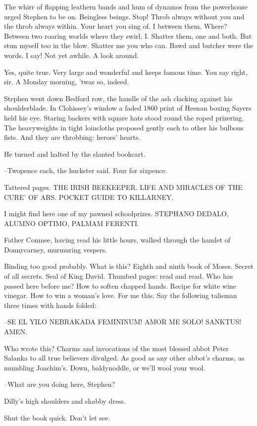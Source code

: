 The whirr of flapping leathern bands
and hum of dynamos from the
powerhouse
urged Stephen to be on.
Beingless beings.
Stop!
Throb always
without you and the throb always within.
Your heart you sing of.
I
between them.
Where?
Between two roaring worlds where they swirl, I.
Shatter them, one and both.
But stun myself too in the blow.
Shatter me
you who can.
Bawd and butcher were the words.
I say!
Not yet awhile.
A
look around.

Yes, quite true.
Very large and wonderful and keeps famous time.
You say
right, sir.
A Monday morning, 'twas so, indeed.

Stephen went down Bedford row,
the handle of the ash
clacking against his
shoulderblade.
In Clohissey's window
a faded 1860 print of Heenan boxing
Sayers
held his eye.
Staring backers with square hats
stood round the
roped prizering.
The heavyweights in tight loincloths proposed gently
each to other
his bulbous fists.
And they are throbbing:
heroes' hearts.

He turned and halted by the slanted bookcart.

--Twopence each,
the huckster said.
Four for sixpence.

Tattered pages.
THE IRISH BEEKEEPER.
LIFE AND MIRACLES OF THE CURE' OF
ARS.
POCKET GUIDE TO KILLARNEY.

I might find here one of my pawned schoolprizes.
STEPHANO DEDALO, ALUMNO OPTIMO, PALMAM FERENTI.

Father Conmee, having read his little hours,
walked through the hamlet of
Donnycarney,
murmuring vespers.

Binding too good probably.
What is this?
Eighth and ninth book of Moses.
Secret of all secrets.
Seal of King David.
Thumbed pages: read and read.
Who has passed here before me?
How to soften chapped hands.
Recipe for
white wine vinegar.
How to win a woman's love.
For me this.
Say the
following talisman three times with hands folded:

--SE EL YILO NEBRAKADA FEMININUM!
AMOR ME SOLO!
SANKTUS!
AMEN.

Who wrote this?
Charms and invocations of the most blessed abbot Peter Salanka
to all true believers divulged.
As good as any other abbot's
charms,
as mumbling Joachim's.
Down, baldynoddle, or we'll wool your
wool.

--What are you doing here, Stephen?

Dilly's high shoulders and shabby dress.

Shut the book quick.
Don't let see.

